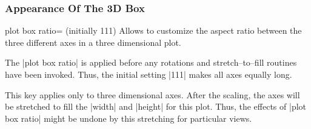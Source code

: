\subsubsection{Appearance Of The 3D Box}

\begin{pgfplotskey}{plot box ratio= (initially {1}{1}{1})}
	Allows to customize the aspect ratio between the three different axes in a three dimensional plot.

	The |plot box ratio| is applied before any rotations and stretch--to--fill routines have been invoked. Thus, the initial setting |{1}{1}{1}| makes all axes equally long.

\pgfplotsexpensiveexample
\begin{codeexample}[]
\end{codeexample}

\pgfplotsexpensiveexample
\begin{codeexample}[]
\end{codeexample}

	This key applies only to three dimensional axes. After the scaling, the axes will be stretched to fill the |width| and |height| for this plot. Thus, the effects of |plot box ratio| might be undone by this stretching for particular views.
\end{pgfplotskey}


